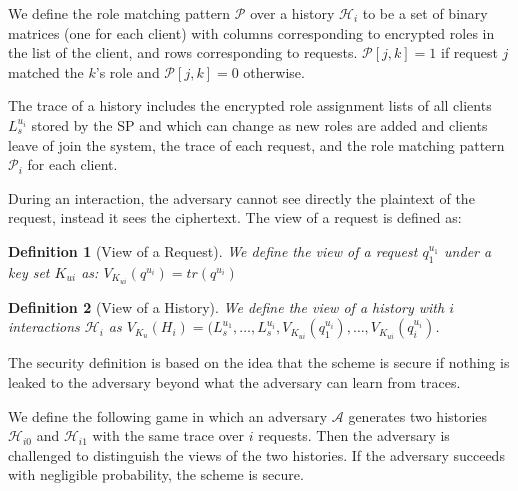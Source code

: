 \documentclass[final,5p,times,twocolumn]{elsarticle}
\newtheorem{definition}{Definition}
\begin{document}
We define the role matching pattern $\mathcal{P}$ over a history $\mathcal{H}_i$ to be a set of  binary matrices (one for each client) with columns corresponding to encrypted roles in the list of the client, and rows corresponding to requests. $\mathcal{P}[j,k]=1$ if request $j$ matched the $k$'s role and $\mathcal{P}[j,k]=0$ otherwise.

The trace of a history includes the encrypted role assignment lists of all clients $L_s^{u_i}$ stored by the SP and which can change as new roles are added and clients leave of join the system, the trace of each request, and the role matching pattern $\mathcal{P}_i$ for each client.

During an interaction, the adversary cannot see directly the plaintext of the request, instead it sees the ciphertext. The view of a request is defined as:

\begin{definition}[View of a Request]
We define the view of a request  $q_{1}^{u_1}$ under a key set $K_{ui}$ as: 
$V_{K_{ui}}(q^{u_i})= tr(q^{u_i})$
\end{definition}

\begin{definition}[View of a History]
We define the view of a history with $i$ interactions $\mathcal{H}_i$ as $V_{K_u}(H_i)=(L_s^{u_1},\ldots,L_s^{u_i},V_{K_{ui}}(q_1^{u_i}),\ldots,V_{K_{ui}}(q_i^{u_i})$.
\end{definition}

The security definition is based on the idea that the scheme is secure if nothing is leaked to the adversary beyond what the adversary can learn from traces.

We define the following game in which an adversary $\mathcal{A}$ generates two histories $\mathcal{H}_{i0}$ and $\mathcal{H}_{i1}$ with the same trace over $i$ requests. Then the adversary is challenged to distinguish the views of the two histories. If the adversary succeeds with negligible probability, the scheme is secure.
\end{document}
